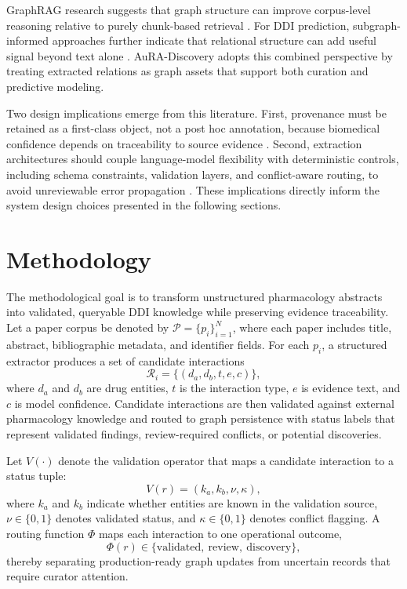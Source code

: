 \documentclass[conference]{Template/IEEEtran}
\begin{document}
GraphRAG research suggests that graph structure can improve corpus-level reasoning relative to purely chunk-based retrieval \cite{edge2024graphrag,han2025graphrag,peng2025graphragsurvey}. For DDI prediction, subgraph-informed approaches further indicate that relational structure can add useful signal beyond text alone \cite{shi2024subgeddi}. AuRA-Discovery adopts this combined perspective by treating extracted relations as graph assets that support both curation and predictive modeling.

Two design implications emerge from this literature. First, provenance must be retained as a first-class object, not a post hoc annotation, because biomedical confidence depends on traceability to source evidence \cite{hansel2023kg,schafer2024biokgrapher}. Second, extraction architectures should couple language-model flexibility with deterministic controls, including schema constraints, validation layers, and conflict-aware routing, to avoid unreviewable error propagation \cite{chen2025benchmark,zhou2024highthroughput}. These implications directly inform the system design choices presented in the following sections.

\section{Methodology}
The methodological goal is to transform unstructured pharmacology abstracts into validated, queryable DDI knowledge while preserving evidence traceability. Let a paper corpus be denoted by $\mathcal{P}=\{p_i\}_{i=1}^{N}$, where each paper includes title, abstract, bibliographic metadata, and identifier fields. For each $p_i$, a structured extractor produces a set of candidate interactions
\[
\mathcal{R}_i = \{(d_a, d_b, t, e, c)\},
\]
where $d_a$ and $d_b$ are drug entities, $t$ is the interaction type, $e$ is evidence text, and $c$ is model confidence. Candidate interactions are then validated against external pharmacology knowledge and routed to graph persistence with status labels that represent validated findings, review-required conflicts, or potential discoveries.

Let $V(\cdot)$ denote the validation operator that maps a candidate interaction to a status tuple:
\[
V(r) = (k_a, k_b, \nu, \kappa),
\]
where $k_a$ and $k_b$ indicate whether entities are known in the validation source, $\nu \in \{0,1\}$ denotes validated status, and $\kappa \in \{0,1\}$ denotes conflict flagging. A routing function $\Phi$ maps each interaction to one operational outcome,
\[
\Phi(r) \in \{\text{validated},\ \text{review},\ \text{discovery}\},
\]
thereby separating production-ready graph updates from uncertain records that require curator attention.
\end{document}
